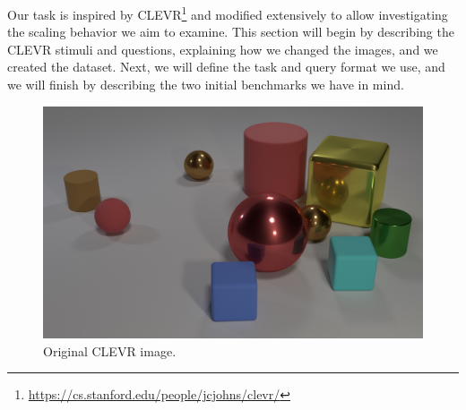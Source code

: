 Our task is inspired by CLEVR\footnote{\url{https://cs.stanford.edu/people/jcjohns/clevr/}} \parencite{Johnson2017} and modified extensively to allow investigating the scaling behavior we aim to examine. This section will begin by describing the CLEVR stimuli and questions, explaining how we changed the images, and we created the dataset. Next, we will define the task and query format we use, and we will finish by describing the two initial benchmarks we have in mind.

\begin{figure}
\vspace{-.4in}
\begin{spacing}{1.0}
\centering
\includegraphics[width=.95\linewidth]{ch-dataset-task-benchmark/figures/dataset/original_clevr_image.png}
\caption{Original CLEVR image.}
\label{fig:dataset-clevr-image}
\end{spacing}
\end{figure}

